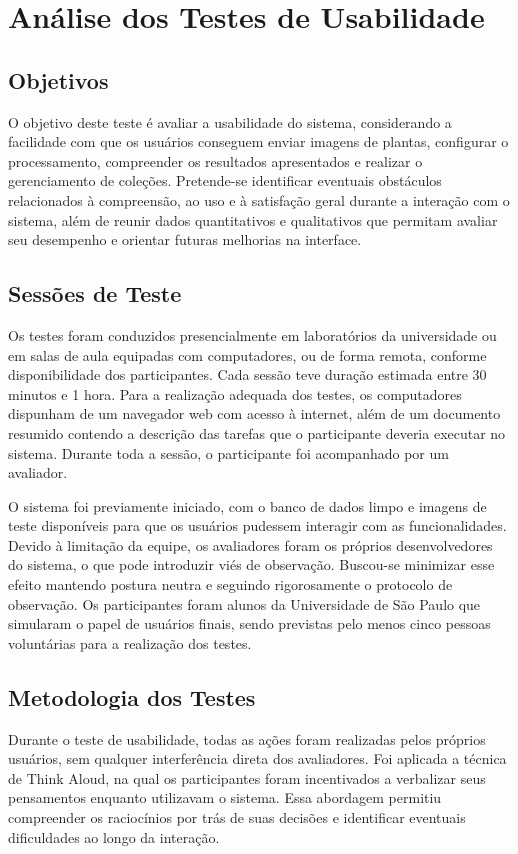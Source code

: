\chapter{Análise dos Testes de Usabilidade}

\section{Objetivos}
O objetivo deste teste é avaliar a usabilidade do sistema, considerando a facilidade com que os usuários conseguem enviar imagens de plantas, configurar o processamento, compreender os resultados apresentados e realizar o gerenciamento de coleções. Pretende-se identificar eventuais obstáculos relacionados à compreensão, ao uso e à satisfação geral durante a interação com o sistema, além de reunir dados quantitativos e qualitativos que permitam avaliar seu desempenho e orientar futuras melhorias na interface.

\section{Sessões de Teste}
Os testes foram conduzidos presencialmente em laboratórios da universidade ou em salas de aula equipadas com computadores, ou de forma remota, conforme disponibilidade dos participantes. Cada sessão teve duração estimada entre 30 minutos e 1 hora. Para a realização adequada dos testes, os computadores dispunham de um navegador web com acesso à internet, além de um documento resumido contendo a descrição das tarefas que o participante deveria executar no sistema. Durante toda a sessão, o participante foi acompanhado por um avaliador.

O sistema foi previamente iniciado, com o banco de dados limpo e imagens de teste disponíveis para que os usuários pudessem interagir com as funcionalidades. Devido à limitação da equipe, os avaliadores foram os próprios desenvolvedores do sistema, o que pode introduzir viés de observação. Buscou-se minimizar esse efeito mantendo postura neutra e seguindo rigorosamente o protocolo de observação. Os participantes foram alunos da Universidade de São Paulo que simularam o papel de usuários finais, sendo previstas pelo menos cinco pessoas voluntárias para a realização dos testes.

\section{Metodologia dos Testes}
Durante o teste de usabilidade, todas as ações foram realizadas pelos próprios usuários, sem qualquer interferência direta dos avaliadores. Foi aplicada a técnica de Think Aloud, na qual os participantes foram incentivados a verbalizar seus pensamentos enquanto utilizavam o sistema. Essa abordagem permitiu compreender os raciocínios por trás de suas decisões e identificar eventuais dificuldades ao longo da interação.

